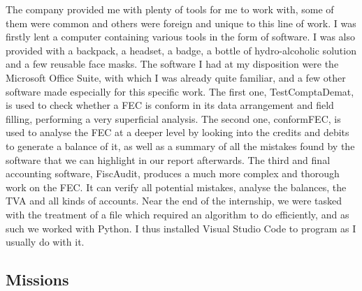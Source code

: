 \documentclass[12pt]{article}
\begin{document}
The company provided me with plenty of tools for me to work with, some of them were common and others were foreign and unique to this line of work. I was firstly lent a computer containing various tools in the form of software. I was also provided with a backpack, a headset, a badge, a bottle of hydro-alcoholic solution and a few reusable face masks. The software I had at my disposition were the Microsoft Office Suite, with which I was already quite familiar, and a few other software made especially for this specific work. The first one, TestComptaDemat, is used to check whether a FEC is conform in its data arrangement and field filling, performing a very superficial analysis. The second one, conformFEC, is used to analyse the FEC at a deeper level by looking into the credits and debits to generate a balance of it, as well as a summary of all the mistakes found by the software that we can highlight in our report afterwards. The third and final accounting software, FiscAudit, produces a much more complex and thorough work on the FEC. It can verify all potential mistakes, analyse the balances, the TVA and all kinds of accounts. Near the end of the internship, we were tasked with the treatment of a file which required an algorithm to do efficiently, and as such we worked with Python. I thus installed Visual Studio Code to program as I usually do with it.

\subsection{Missions}
\end{document}
